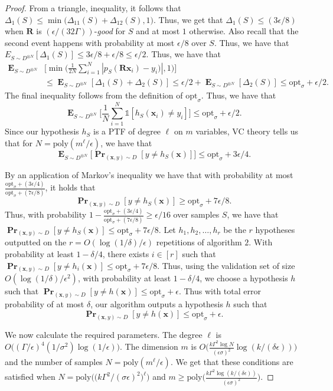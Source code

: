 \documentclass[10pt,a4paper]{article}
\renewcommand\vec[1]{\mathbf{#1}}
\DeclareMathOperator*{\pr}{\mathbf{Pr}}
\DeclareMathOperator*{\E}{\mathbf{E}}
\newcommand{\poly}{\mathrm{poly}}
\newcommand{\1}{\Ind}
\newcommand{\smoothopt}{\mathrm{opt}_{\sigma}}
\newcommand{\x}{\vec x}
\newcommand{\Djoint}{D}
\newcommand{\ind}{\mathds{1}}
\begin{document}
\begin{proof}
From a triangle, inequality, it follows that $\Delta_1(S)\leq \min\bigl(\Delta_{11}(S)+\Delta_{12}(S),1\bigr)$. Thus, we get that $\Delta_1(S)\leq (3\epsilon/8)$ when $\vec R$ is $(\epsilon/(32\Gamma))$-\textit{good} for $S$ and at most $1$ otherwise.
Also recall that the second event happens with probability at most $\epsilon/8$ over $S$. Thus, we have that $E_{S\sim D^{\otimes N}}[\Delta_1(S)]\leq 3\epsilon/8+\epsilon/8\leq \epsilon/2$.
Thus, we have that
\begin{align*}
    \E_{S\sim D^{\otimes N}}&\biggl[\min\biggl(\frac{1}{2N}\sum_{i=1}^{N}|p_S(\vec R\x_i)-y_i)|,1\biggr)\biggr]\\&\leq \E_{S\sim D^{\otimes N}}[\Delta_1(S)+\Delta_2(S)]\leq \epsilon/2+\E_{S\sim D^{\otimes N}}[\Delta_2(S)]
\leq \smoothopt+\epsilon/2.
\end{align*}
 The final inequality follows from the definition of $\smoothopt$. Thus, we have that 
\[
\E_{S\sim D^{\otimes N}}\biggl[\frac{1}{N}\sum_{i=1}^{N}\ind[h_S(\x_i)\neq y_i]\biggr]\leq \smoothopt+\epsilon/2.
\] Since our hypothesis $h_S$ is a PTF of degree $\ell$ on $m$ variables, VC theory tells us that for $N=\poly(m^{\ell}/\epsilon)$, we have that 
\[
\E_{S\sim D^{\otimes N}}\biggl[\pr_{(\x, y) \sim \Djoint}[y\neq h_S(\x)]\biggr]\leq \smoothopt+3\epsilon/4.
\] 

By an application of Markov's inequality  we have that with probability at most $\frac{\smoothopt+(3\epsilon/4)}{\smoothopt+(7\epsilon/8)}$, it holds that 
\[
\pr_{(\x, y) \sim \Djoint}[y\neq h_S(\x)]\geq \smoothopt+7\epsilon/8.
\] Thus, with probability $1-\frac{\smoothopt+(3\epsilon/4)}{\smoothopt+(7\epsilon/8)}\geq \epsilon/16$  over samples $S$, we have that $\pr_{(\x, y) \sim \Djoint}[y\neq h_S(\x)]\leq \smoothopt+ 7\epsilon/8$. Let $h_1,h_2,\ldots, h_r$ be the $r$ hypotheses outputted on the $r=O(\log(1/\delta)/\epsilon)$ repetitions of algorithm $2$. With probability at least $1-\delta/4$, there exists $i\in [r]$ such that  $\pr_{(\x, y) \sim \Djoint}[y\neq h_i(\x)]\leq \smoothopt+ 7\epsilon/8$. Thus, using the validation set of size $O(\log(1/\delta)/\epsilon^2)$, with probability at least $1-\delta/4$, we choose a hypothesis $h$ such that $\pr_{(\x, y) \sim \Djoint}[y\neq h(\x)]\leq \smoothopt+ \epsilon$. Thus with total error probability of at most $\delta$, our algorithm outputs a hypothesis $h$ such that
\[
\pr_{(\x,y)\sim D}[y\neq h(\x)]\leq \smoothopt+\epsilon.
\]

We now calculate the required parameters. The degree $\ell$ is $O\bigl((\Gamma/\epsilon)^4(1/\sigma^2)\log(1/\epsilon)\bigr)$. The dimension $m$ is $O\bigl(\frac{k\Gamma^2\log N}{(\epsilon\sigma)^2}\log(k/(\delta\epsilon))\bigr)$ and the number of samples $N=\poly(m^{\ell}/\epsilon)$. We get that these conditions are satisfied when $N=\poly\biggl(\bigl(k\Gamma^2/(\sigma\epsilon)^2\bigr)^{\ell}\biggr)$ and $m\geq \poly\biggl(\frac{k\Gamma^2\log(k/(\delta\epsilon))}{(\epsilon\sigma)^2}\biggr)$.
\end{proof}
\end{document}
